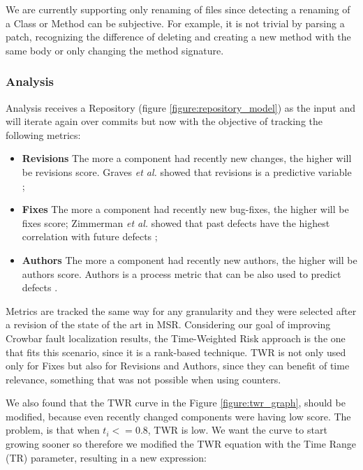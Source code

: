 We are currently supporting only renaming of files since detecting a renaming of
a Class or Method can be subjective. For example, it is not trivial by parsing
a patch, recognizing the difference of deleting and creating a new method with
the same body or only changing the method signature.

\subsubsection{Analysis}
Analysis receives a Repository (figure \ref{figure:repository_model}) as the
input and will iterate again over commits but now with the objective of
tracking the following metrics:

\begin{itemize}
\item \textbf{Revisions} The more a component had recently new changes, the
higher will be revisions score. Graves \textit{et al.} showed that revisions is
 a predictive variable \cite{859533};
\item \textbf{Fixes} The more a component had recently new bug-fixes, the higher
will be fixes score; Zimmerman \textit{et al.} showed that past defects have the
highest correlation with future defects \cite{Zimmermann:2007:PDE:1268984.1269057};
\item \textbf{Authors} The more a component had recently new authors, the higher
will be authors score. Authors is a process metric that can be also used to
predict defects \cite{Moser:2008:CAE:1368088.1368114,D'Ambros:2012:EDP:2318097.2318149}.
\end{itemize}

Metrics are tracked the same way for any granularity and they were selected
after a revision of the state of the art in MSR.
Considering our goal of improving Crowbar fault localization results, the
Time-Weighted Risk approach is the one that fits this scenario, since it is a
rank-based technique. TWR is not only used only for Fixes but also for Revisions
and Authors, since they can benefit of time relevance, something that was not
possible when using counters.

We also found that the TWR curve in the Figure \ref{figure:twr_graph}, should be
modified, because even recently changed components were having low score. The
problem, is that when \( t_i <= 0.8 \), TWR is low. We want the curve to start
growing sooner so therefore we modified the TWR equation with the Time Range
(TR) parameter, resulting in a new expression:

